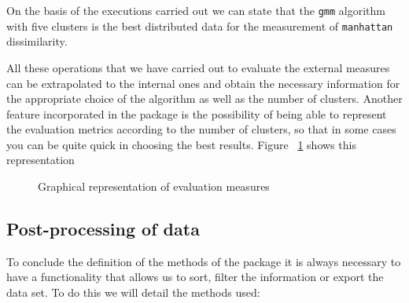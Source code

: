On the basis of the executions carried out we can state that the \texttt{gmm} algorithm with five clusters is the best distributed data for the measurement of \texttt{manhattan} dissimilarity.

All these operations that we have carried out to evaluate the external measures can be extrapolated to the internal ones and obtain the necessary information for the appropriate choice of the algorithm as well as the number of clusters. Another feature incorporated in the package is the possibility of being able to represent the evaluation metrics according to the number of clusters, so that in some cases you can be quite quick in choosing the best results. Figure ~\ref{fig:clustering} shows this representation

\begin{figure}[htbp]
  \centering
    \qquad
    \caption{Graphical representation of evaluation measures}%
    \label{fig:clustering}%
\end{figure}

\subsection*{Post-processing of data}

To conclude the definition of the methods of the package it is always necessary to have a functionality that allows us to sort, filter the information or export the data set. To do this we will detail the methods used:


